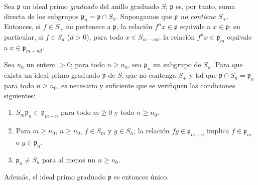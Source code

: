 \documentclass[oneside,10pt]{amsart}
\renewcommand{\geq}{\geqslant}
\let\EGAOriginalLabel\label
\renewcommand{\label}[1]{\phantomsection\EGAOriginalLabel{#1}}
\begin{document}
\begin{env}[2.1.8]
\label{II.2.1.8-fr}
Sea $\mathfrak{p}$ un ideal primo \emph{graduado} del anillo graduado $S$; $\mathfrak{p}$ es, por tanto, suma directa de los subgrupos $\mathfrak{p}_n=\mathfrak{p}\cap S_n$.
Supongamos que \emph{$\mathfrak{p}$ no contiene $S_+$}.
Entonces, si $f\in S_+$ no pertenece a $\mathfrak{p}$, la relación $f^nx\in\mathfrak{p}$ equivale a $x\in\mathfrak{p}$; en particular, si $f\in S_d$ ($d>0$), para todo $x\in S_{m-nd}$, la relación $f^nx\in\mathfrak{p}_m$ equivale a $x\in\mathfrak{p}_{m-nd}$.
\end{env}

\begin{proposition}[2.1.9]
\label{II.2.1.9-fr}
Sea $n_0$ un entero $>0$; para todo $n\geq n_0$, sea $\mathfrak{p}_n$ un subgrupo de $S_n$.
Para que exista un ideal primo graduado $\mathfrak{p}$ de $S$, que no contenga $S_+$ y tal que $\mathfrak{p}\cap S_n=\mathfrak{p}_n$ para todo $n\geq n_0$, es necesario y suficiente que se verifiquen las condiciones siguientes:
\begin{enumerate}
  \item[{\rm($1^\circ$)}] $S_m\mathfrak{p}_n\subset\mathfrak{p}_{m+n}$ para todo $m\geq 0$ y todo $n\geq n_0$.
  \item[{\rm($2^\circ$)}] Para $m\geq n_0$, $n\geq n_0$, $f\in S_m$ y $g\in S_n$, la relación $fg\in\mathfrak{p}_{m+n}$ implica $f\in\mathfrak{p}_m$ o $g\in\mathfrak{p}_n$.
  \item[{\rm($3^\circ$)}] $\mathfrak{p}_n\neq S_n$ para al menos un $n\geq n_0$.
\end{enumerate}
Además, el ideal primo graduado $\mathfrak{p}$ es entonces único.
\end{proposition}
\end{document}
